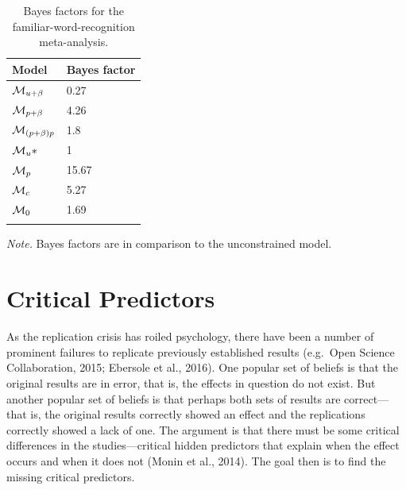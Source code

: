 \documentclass[english,,man]{apa6}
\begin{document}
\begin{table}[tbp]

\begin{center}
\begin{threeparttable}

\caption{\label{tab:covariate-tab}Bayes factors for the familiar-word-recognition meta-analysis.}

\begin{tabular}{ll}
\toprule
Model & \multicolumn{1}{c}{Bayes factor}\\
\midrule
${\cal M}_{u+\beta}$ & 0.27\\
${\cal M}_{p+\beta}$ & 4.26\\
${\cal M}_{(p+\beta)p}$ & 1.8\\
${\cal M}_{u}*$ & 1\\
${\cal M}_{p}$ & 15.67\\
${\cal M}_{c}$ & 5.27\\
${\cal M}_{0}$ & 1.69\\
\bottomrule
\addlinespace
\end{tabular}

\begin{tablenotes}[para]
\normalsize{\textit{Note.} Bayes factors are in comparison to the unconstrained model.}
\end{tablenotes}

\end{threeparttable}
\end{center}

\end{table}

\hypertarget{critical-predictors}{%
\section{Critical Predictors}\label{critical-predictors}}

As the replication crisis has roiled psychology, there have been a number of prominent failures to replicate previously established results (e.g.~Open Science Collaboration, 2015; Ebersole et al., 2016). One popular set of beliefs is that the original results are in error, that is, the effects in question do not exist. But another popular set of beliefs is that perhaps both sets of results are correct---that is, the original results correctly showed an effect and the replications correctly showed a lack of one. The argument is that there must be some critical differences in the studies---critical hidden predictors that explain when the effect occurs and when it does not (Monin et al., 2014). The goal then is to find the missing critical predictors.
\end{document}
